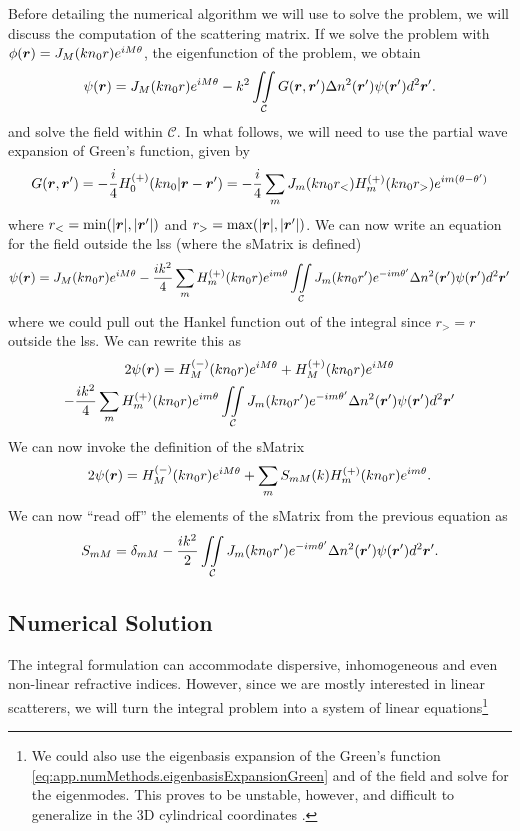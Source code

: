 Before detailing the numerical algorithm we will use to solve the problem, 
we will discuss the computation of the scattering matrix. 
If we solve the problem with $\phi(\boldsymbol{r}) = J_M(kn_0r)e^{iM\theta}$, 
the eigenfunction of the problem, we obtain
	\begin{equation}
		\psi(\boldsymbol{r}) = J_M(kn_0r)e^{iM\theta} -k^2\mathop{\iint}_\mathcal{C}G(\boldsymbol{r},\boldsymbol{r}')\Delta n^2(\boldsymbol{r}')\psi(\boldsymbol{r}')d^2\boldsymbol{r}'.
	\end{equation}
and solve the field within $\mathcal{C}$. In what follows, we will
need to use the partial wave expansion of Green's function, given by
\cite{ECO2006}
	\begin{equation}
		\label{eq:app.numMethods.eigenbasisExpansionGreen}
		G(\boldsymbol{r},\boldsymbol{r}') = -\frac{i}{4}H_0^{(+)}(kn_0|\boldsymbol{r}-\boldsymbol{r}') = -\frac{i}{4}\sum_m J_m(kn_0r_<)H_m^{(+)}(kn_0r_>)e^{im(\theta-\theta')}
	\end{equation}
where $r_<=\min(|\boldsymbol{r}|,|\boldsymbol{r}'|)$ and $r_>=\max(|\boldsymbol{r}|,|\boldsymbol{r}'|)$.
We can now write an equation for the field outside the \gls{lss} (where
the \gls{sMatrix} is defined)
	\begin{equation}
			\psi(\boldsymbol{r}) = J_M(kn_0r)e^{iM\theta}
						-\frac{ik^2}{4}\sum_m H_m^{(+)}(kn_0r)e^{im\theta}
						\mathop{\iint}_\mathcal{C} J_m(kn_0r')e^{-im\theta'}\Delta n^2(\boldsymbol{r}')\psi(\boldsymbol{r}')d^2\boldsymbol{r}'
	\end{equation}
where we could pull out the Hankel function out of the integral since
$r_>=r$ outside the \gls{lss}. We can rewrite this as
	\begin{multline}
		2\psi(\boldsymbol{r}) = H_M^{(-)}(kn_0r)e^{iM\theta}+H_M^{(+)}(kn_0r)e^{iM\theta} \\
						-\frac{ik^2}{4}\sum_m H_m^{(+)}(kn_0r)e^{im\theta}
						\mathop{\iint}_\mathcal{C} J_m(kn_0r')e^{-im\theta'}\Delta n^2(\boldsymbol{r}')\psi(\boldsymbol{r}')d^2\boldsymbol{r}'
	\end{multline}
We can now invoke the definition of the \gls{sMatrix}
	\begin{equation}
		2\psi(\boldsymbol{r}) = H_M^{(-)}(kn_0r)e^{iM\theta}+\sum_m S_{mM}(k)H_m^{(+)}(kn_0r)e^{im\theta}.
	\end{equation}
We can now ``read off'' the elements of the \gls{sMatrix}
from the previous equation as
	\begin{equation}
		S_{mM} = \delta_{mM}-\frac{ik^2}{2}\mathop{\iint}_\mathcal{C}J_m(kn_0r')e^{-im\theta'}\Delta n^2(\boldsymbol{r}')\psi(\boldsymbol{r}')d^2\boldsymbol{r}'.
	\end{equation}

\subsection{Numerical Solution}
The integral formulation can accommodate dispersive, inhomogeneous and even non-linear refractive indices. 
However, since we are mostly interested in linear scatterers, we will turn the integral problem
into a system of linear equations\footnote{We could also use the eigenbasis expansion
of the Green's function \eqref{eq:app.numMethods.eigenbasisExpansionGreen} and of
the field and solve for the eigenmodes. This proves to be unstable, however, and
difficult to generalize in the 3D cylindrical coordinates \cite{BEN1968}.}

